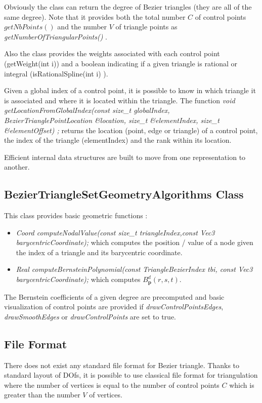 \documentclass[a4paper,11pt]{article}
\newcommand{\ncontrols}{{C}}
\begin{document}
Obviously the class can return the degree of  Bezier triangles  (they are all of the same degree). Note that it provides both the total number $\ncontrols$ of control points $getNbPoints()$ and the number $V$ of triangle points as {\it getNumberOfTriangularPoints() }.

Also the class provides the weights associated with each control point (getWeight(int i)) and a boolean indicating if a given triangle is rational or integral (isRationalSpline(int i) ).

Given a global index of a control point, it is possible to know in which triangle it is associated and where it is located within the triangle. 
The function {\it void getLocationFromGlobalIndex(const size\_t globalIndex, BezierTrianglePointLocation \&location, 
		size\_t \&elementIndex, size\_t \&elementOffset) ;} returns the location (point, edge or triangle) of a control point, the index of the triangle (elementIndex) and the rank within its location.
		
		
Efficient internal data structures are built to move from one representation to another.


\subsection{BezierTriangleSetGeometryAlgorithms Class}

This class provides basic geometric functions :

\begin{itemize}
	\item {\it Coord computeNodalValue(const size\_t triangleIndex,const Vec3 barycentricCoordinate); } which computes the position / value of a node given the index of a triangle and its barycentric coordinate.
	\item {\it Real computeBernsteinPolynomial(const TriangleBezierIndex tbi, const Vec3 barycentricCoordinate);} which computes $B^d_{\mathbf p}(r,s,t)$.
\end{itemize}

The Bernstein coefficients of a given degree are precomputed and basic visualization of control points are provided if {\it drawControlPointsEdges},  {\it drawSmoothEdges}  or  {\it drawControlPoints} are set to true.  


\subsection{File Format}

There does not exist any standard file format for Bezier triangle. Thanks to standard layout of DOfs, it is possible to use classical file format for triangulation where the number of vertices is equal to the number of control points $\ncontrols$  which is greater than the number $V$ of vertices.
\end{document}
